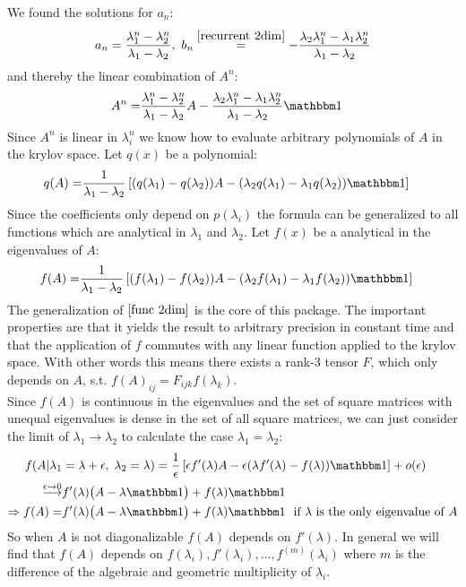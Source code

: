 \documentclass[12pt]{article}
\begin{document}
We found the solutions for $a_n$:
\begin{align}
a_n = \frac {\lambda_1^n - \lambda_2^n}{\lambda_1 - \lambda_2},\ b_n \overset{\eqref{recurrent 2dim}}=-\frac {\lambda_2\lambda_1^n - \lambda_1\lambda_2^n}{\lambda_1 - \lambda_2}
\end{align}
and thereby the linear combination of $A^n$:
\begin{align}
A^n =& \frac {\lambda_1^n - \lambda_2^n}{\lambda_1 - \lambda_2} A - \frac {\lambda_2\lambda_1^n - \lambda_1\lambda_2^n}{\lambda_1 - \lambda_2} \mathbbm 1
\end{align}
Since $A^n$ is linear in $\lambda_i^n$ we know how to evaluate arbitrary polynomials of $A$ in the krylov space. Let $q(x)$ be a polynomial:
\begin{align}
q(A) =& \frac 1{\lambda_1 - \lambda_2} \left[(q(\lambda_1) - q(\lambda_2))A - (\lambda_2 q(\lambda_1) - \lambda_1 q(\lambda_2)) \mathbbm 1\right]
\end{align}
Since the coefficients only depend on $p(\lambda_i)$ the formula can be generalized to all functions which are analytical in $\lambda_1$ and $\lambda_2$. Let $f(x)$ be a analytical in the eigenvalues of $A$:
\begin{align}
f(A) =& \frac 1{\lambda_1 - \lambda_2} \left[(f(\lambda_1) - f(\lambda_2))A - (\lambda_2 f(\lambda_1) - \lambda_1 f(\lambda_2)) \mathbbm 1\right] \label{func 2dim}
\end{align}
The generalization of $\eqref{func 2dim}$ is the core of this package. The important properties are that it yields the result to arbitrary precision in constant time and that the application of $f$ commutes with any linear function applied to the krylov space. With other words this means there exists a rank-3 tensor $F$, which only depends on $A$, s.t. $f(A)_{ij} = F_{ijk} f(\lambda_k)$.\\
Since $f(A)$ is continuous in the eigenvalues and the set of square matrices with unequal eigenvalues is dense in the set of all square matrices, we can just consider the limit of $\lambda_1 \to \lambda_2$ to calculate the case $\lambda_1 = \lambda_2$:
\begin{align}
f(A|\lambda_1&=\lambda+\epsilon,\; \lambda_2 = \lambda) = \frac 1\epsilon \left[ \epsilon f'(\lambda) A - \epsilon(\lambda f'(\lambda) - f(\lambda))\mathbbm 1 \right] + o(\epsilon) \nonumber\\
\overset{\epsilon\to 0}{\longrightarrow}& f'(\lambda)\big( A-\lambda \mathbbm 1 \big) + f(\lambda)\mathbbm 1\nonumber\\
\Rightarrow f(A) =& f'(\lambda)\big( A-\lambda \mathbbm 1 \big) + f(\lambda)\mathbbm 1\ \ \text{if $\lambda$ is the only eigenvalue of $A$}  \label{func 2dim 1eigval}
\end{align}
So when $A$ is not diagonalizable $f(A)$ depends on $f'(\lambda)$. In general we will find that $f(A)$ depends on $f(\lambda_i), f'(\lambda_i), \dots, f^{(m)}(\lambda_i)$ where $m$ is the difference of the algebraic and geometric multiplicity of $\lambda_i$.
\end{document}
